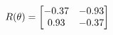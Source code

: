 \documentclass[preview]{standalone}
\begin{document}
\begin{align*}
\special{dvisvgm:raw <g id='unique000'>}R(\theta) = \begin{bmatrix}-0.37 & -0.93\\0.93 & -0.37\end{bmatrix}\special{dvisvgm:raw </g>}
\end{align*}
\end{document}
